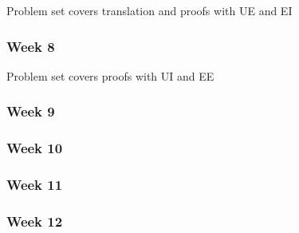 \documentclass[12pt]{article}
\begin{document}
Problem set covers translation and proofs with UE and EI


\subsubsection*{Week 8}

Problem set covers proofs with UI and EE


\subsubsection*{Week 9}


\subsubsection*{Week 10}

\subsubsection*{Week 11}

\subsubsection*{Week 12}
\end{document}
